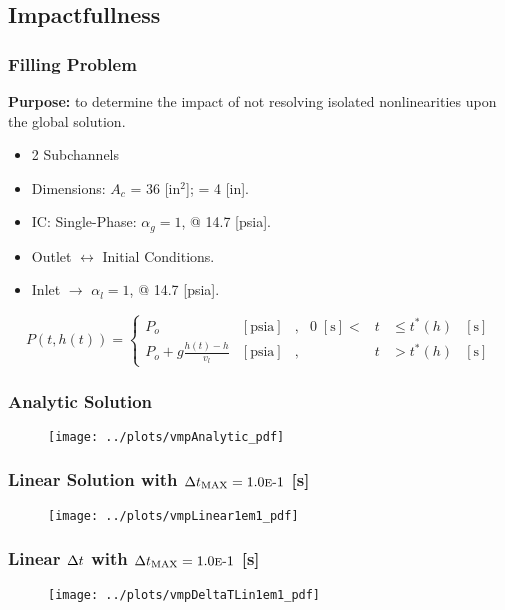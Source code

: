 \documentclass[compress,xcolor=table]{beamer}
\begin{document}
\subsection[Impactfullness]{Impactfullness}
\begin{frame}
\frametitle{Filling Problem}

\textbf{Purpose:} to determine the impact of not resolving isolated nonlinearities upon the global solution.

\begin{itemize}
\item{2 Subchannels}
\item{Dimensions: $A_{c}$ = 36 [in$^2$]; \dx{} = 4 [in].}
\item{IC: Single-Phase: $\alpha_{g} = 1$, @ 14.7 [psia].}
\item{Outlet $\longleftrightarrow$ Initial Conditions.}
\item{Inlet $\rightarrow$ $\alpha_{l}=1$, @ 14.7 [psia].}
\end{itemize}
\begin{equation*}
P(t, h(t))= 
 \left\{
\begin{array}{cclrcll}
P_o & [ \text{psia} ] & , & 0\; [\text{s}] < & t & \leq t^{*}(h) & [\text{s}] \\
P_o + g \frac{ h(t) - h }{ v_{l} } & [ \text{psia} ] & , &  & t & > t^{*}(h) & [\text{s}]
\end{array}\right.
\end{equation*}

\end{frame}
\begin{frame}
\frametitle{Analytic Solution}

\begin{figure}[h!t]
\centering
\texttt{[image: ../plots/vmpAnalytic\_pdf]}
\end{figure}

\end{frame}
\begin{frame}
\frametitle{Linear Solution with $\dtmax{} = \expneg{1.0}{1}$ [s]}

\begin{figure}[h!t]
\centering
\texttt{[image: ../plots/vmpLinear1em1\_pdf]}
\end{figure}

\end{frame}
\begin{frame}
\frametitle{Linear $\dt{}$ with $\dtmax{} = \expneg{1.0}{1}$ [s]}

\begin{figure}[h!t]
\centering
\texttt{[image: ../plots/vmpDeltaTLin1em1\_pdf]}
\end{figure}

\end{frame}
\end{document}

